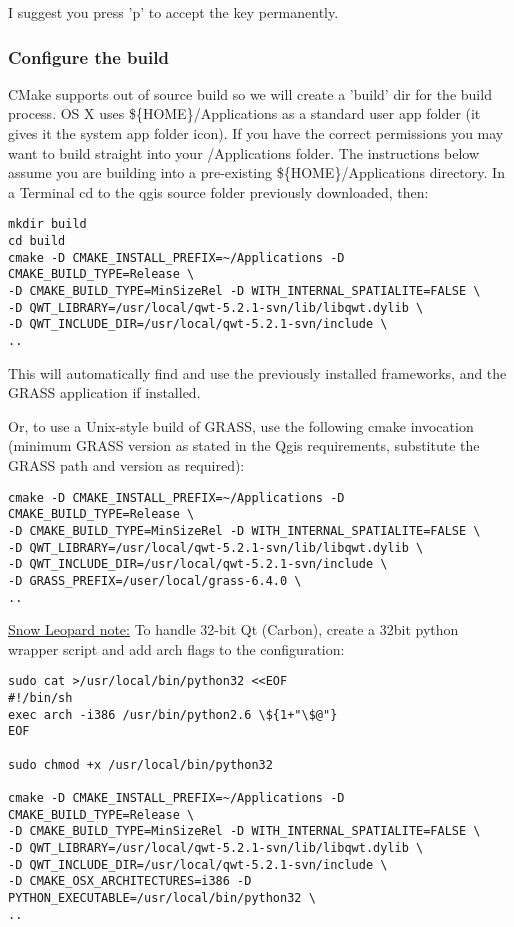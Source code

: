 I suggest you press 'p' to accept the key permanently.

\hypertarget{toc24}{}
\subsubsection{Configure the build}
CMake supports out of source build so we will create a 'build' dir for the
build process. OS X uses \$\{HOME\}/Applications as a standard user app folder (it gives it the system app folder icon).
If you have the correct permissions you may want to build
straight into your /Applications folder. The instructions below assume you are
building into a pre-existing \$\{HOME\}/Applications directory.
In a Terminal cd to the qgis source folder previously downloaded, then:

\begin{verbatim}
mkdir build
cd build
cmake -D CMAKE_INSTALL_PREFIX=~/Applications -D CMAKE_BUILD_TYPE=Release \
-D CMAKE_BUILD_TYPE=MinSizeRel -D WITH_INTERNAL_SPATIALITE=FALSE \
-D QWT_LIBRARY=/usr/local/qwt-5.2.1-svn/lib/libqwt.dylib \
-D QWT_INCLUDE_DIR=/usr/local/qwt-5.2.1-svn/include \
..
\end{verbatim}

This will automatically find and use the previously installed frameworks, and the GRASS
application if installed.

Or, to use a Unix-style build of GRASS, use the following cmake invocation
(minimum GRASS version as stated in the Qgis requirements, substitute the GRASS
path and version as required):

\begin{verbatim}
cmake -D CMAKE_INSTALL_PREFIX=~/Applications -D CMAKE_BUILD_TYPE=Release \
-D CMAKE_BUILD_TYPE=MinSizeRel -D WITH_INTERNAL_SPATIALITE=FALSE \
-D QWT_LIBRARY=/usr/local/qwt-5.2.1-svn/lib/libqwt.dylib \
-D QWT_INCLUDE_DIR=/usr/local/qwt-5.2.1-svn/include \
-D GRASS_PREFIX=/user/local/grass-6.4.0 \
..
\end{verbatim}

\underline{Snow Leopard note:} To handle 32-bit Qt (Carbon), create a 32bit python wrapper
script and add arch flags to the configuration:

\begin{verbatim}
sudo cat >/usr/local/bin/python32 <<EOF
#!/bin/sh
exec arch -i386 /usr/bin/python2.6 \${1+"\$@"}
EOF

sudo chmod +x /usr/local/bin/python32

cmake -D CMAKE_INSTALL_PREFIX=~/Applications -D CMAKE_BUILD_TYPE=Release \
-D CMAKE_BUILD_TYPE=MinSizeRel -D WITH_INTERNAL_SPATIALITE=FALSE \
-D QWT_LIBRARY=/usr/local/qwt-5.2.1-svn/lib/libqwt.dylib \
-D QWT_INCLUDE_DIR=/usr/local/qwt-5.2.1-svn/include \
-D CMAKE_OSX_ARCHITECTURES=i386 -D PYTHON_EXECUTABLE=/usr/local/bin/python32 \
..
\end{verbatim}

